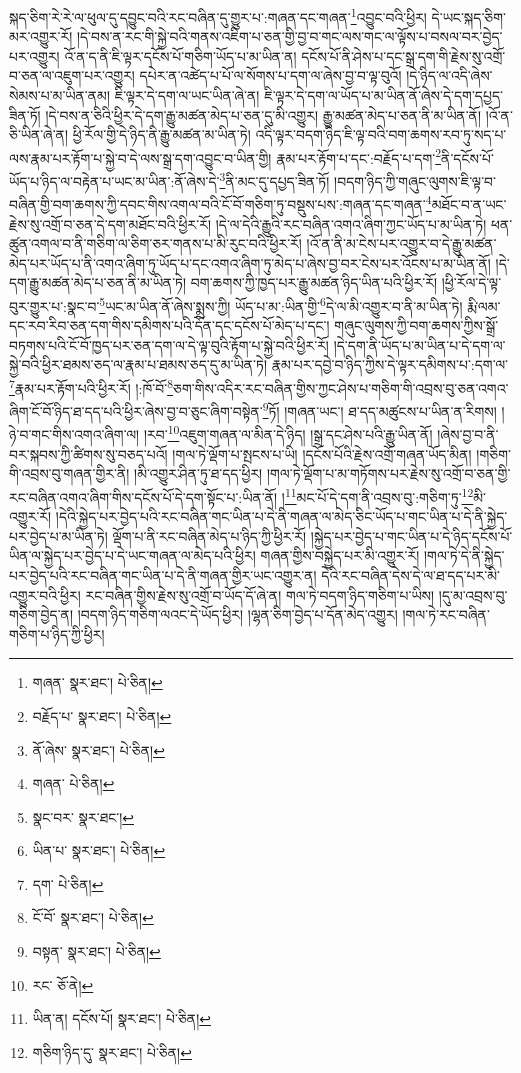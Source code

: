 སྐད་ཅིག་རེ་རེ་ལ་ཕུལ་དུ་དབྱུང་བའི་རང་བཞིན་དུ་གྱུར་པ་:གཞན་དང་གཞན་\footnote{གཞན་  སྣར་ཐང་།  པེ་ཅིན། }འབྱུང་བའི་ཕྱིར། དེ་ཡང་སྐད་ཅིག་མར་འགྱུར་རོ། །དེ་བས་ན་རང་གི་སྐྱེ་བའི་གནས་འཇིག་པ་ཅན་གྱི་བྱ་བ་གང་ལས་གང་ལ་ལྟོས་པ་བསལ་བར་བྱེད་པར་འགྱུར། འོ་ན་ད་ནི་ཇི་ལྟར་དངོས་པོ་གཅིག་ཡོད་པ་མ་ཡིན་ན། དངོས་པོ་ནི་ཤེས་པ་དང་སྒྲ་དག་གི་རྗེས་སུ་འགྲོ་བ་ཅན་ལ་འཇུག་པར་འགྱུར། དཔེར་ན་འཚེད་པ་པོ་ལ་སོགས་པ་དག་ལ་ཞེས་བྱ་བ་ལྟ་བུའོ། །དེ་ཉིད་ལ་འདི་ཞེས་སེམས་པ་མ་ཡིན་ནམ། ཇི་ལྟར་དེ་དག་ལ་ཡང་ཡིན་ཞེ་ན། ཇི་ལྟར་དེ་དག་ལ་ཡོད་པ་མ་ཡིན་ནོ་ཞེས་དེ་དག་དཔྱད་ཟིན་ཏོ། །དེ་བས་ན་ཅིའི་ཕྱིར་དེ་དག་རྒྱུ་མཚན་མེད་པ་ཅན་དུ་མི་འགྱུར། རྒྱུ་མཚན་མེད་པ་ཅན་ནི་མ་ཡིན་ནོ། །འོ་ན་ཅི་ཡིན་ཞེ་ན། ཕྱི་རོལ་གྱི་དེ་ཉིད་ནི་རྒྱུ་མཚན་མ་ཡིན་ཏེ། འདི་ལྟར་བདག་ཉིད་ཇི་ལྟ་བའི་བག་ཆགས་རབ་ཏུ་སད་པ་ལས་རྣམ་པར་རྟོག་པ་སྐྱེ་བ་དེ་ལས་སྒྲ་དག་འབྱུང་བ་ཡིན་གྱི། རྣམ་པར་རྟོག་པ་དང་:བརྗོད་པ་དག་\footnote{བརྗོད་པ་  སྣར་ཐང་།  པེ་ཅིན། }ནི་དངོས་པོ་ཡོད་པ་ཉིད་ལ་བརྟེན་པ་ཡང་མ་ཡིན་:ནོ་ཞེས་དེ་\footnote{ནོ་ཞེས་  སྣར་ཐང་།  པེ་ཅིན། }ནི་མང་དུ་དཔྱད་ཟིན་ཏོ། །བདག་ཉིད་ཀྱི་གཞུང་ལུགས་ཇི་ལྟ་བ་བཞིན་གྱི་བག་ཆགས་ཀྱི་དབང་གིས་འགལ་བའི་ངོ་བོ་གཅིག་ཏུ་བསྡུས་པས་:གཞན་དང་གཞན་\footnote{གཞན་  པེ་ཅིན། }མཐོང་བ་ན་ཡང་རྗེས་སུ་འགྲོ་བ་ཅན་དེ་དག་མཐོང་བའི་ཕྱིར་རོ། །དེ་ལ་དེའི་རྒྱུའི་རང་བཞིན་འགའ་ཞིག་ཀྱང་ཡོད་པ་མ་ཡིན་ཏེ། ཕན་ཚུན་འགལ་བ་ནི་གཅིག་ལ་ཅིག་ཅར་གནས་པ་མི་རུང་བའི་ཕྱིར་རོ། །འོ་ན་ནི་མ་ངེས་པར་འགྱུར་བ་དེ་རྒྱུ་མཚན་མེད་པར་ཡོད་པ་ནི་འགའ་ཞིག་ཏུ་ཡོད་པ་དང་འགའ་ཞིག་ཏུ་མེད་པ་ཞེས་བྱ་བར་ངེས་པར་འོངས་པ་མ་ཡིན་ནོ། །དེ་དག་རྒྱུ་མཚན་མེད་པ་ཅན་ནི་མ་ཡིན་ཏེ། བག་ཆགས་ཀྱི་ཁྱད་པར་རྒྱུ་མཚན་ཉིད་ཡིན་པའི་ཕྱིར་རོ། །ཕྱི་རོལ་དེ་ལྟ་བུར་གྱུར་པ་:སྣང་བ་\footnote{སྣང་བར་  སྣར་ཐང་། }ཡང་མ་ཡིན་ནོ་ཞེས་སྨྲས་ཀྱི། ཡོད་པ་མ་:ཡིན་གྱི་\footnote{ཡིན་པ་  སྣར་ཐང་།  པེ་ཅིན། }དེ་ལ་མི་འགྱུར་བ་ནི་མ་ཡིན་ཏེ། རྨི་ལམ་དང་རབ་རིབ་ཅན་དག་གིས་དམིགས་པའི་དོན་དང་དངོས་པོ་མེད་པ་དང་། གཞུང་ལུགས་ཀྱི་བག་ཆགས་ཀྱིས་སྒྲོ་བཏགས་པའི་ངོ་བོ་ཁྱད་པར་ཅན་དག་ལ་དེ་ལྟ་བུའི་རྟོག་པ་སྐྱེ་བའི་ཕྱིར་རོ། །དེ་དག་ནི་ཡོད་པ་མ་ཡིན་པ་དེ་དག་ལ་སྐྱེ་བའི་ཕྱིར་ཐམས་ཅད་ལ་རྣམ་པ་ཐམས་ཅད་དུ་མ་ཡིན་ཏེ། རྣམ་པར་དབྱེ་བ་ཉིད་ཀྱིས་དེ་ལྟར་དམིགས་པ་:དག་ལ་\footnote{དག་  པེ་ཅིན། }རྣམ་པར་རྟོག་པའི་ཕྱིར་རོ། །:ཁོ་བོ་\footnote{ངོ་བོ་  སྣར་ཐང་།  པེ་ཅིན། }ཅག་གིས་འདིར་རང་བཞིན་གྱིས་ཀྱང་ཤེས་པ་གཅིག་གི་འབྲས་བུ་ཅན་འགའ་ཞིག་ངོ་བོ་ཉིད་ཐ་དད་པའི་ཕྱིར་ཞེས་བྱ་བ་ཅུང་ཞིག་བསྟེན་\footnote{བསྟན་  སྣར་ཐང་།  པེ་ཅིན། }ཏོ། །གཞན་ཡང་། ཐ་དད་མཚུངས་པ་ཡིན་ན་རིགས། །ཉེ་བ་གང་གིས་འགའ་ཞིག་ལ། །རབ་\footnote{རང་  ཅོ་ནེ། }འཇུག་གཞན་ལ་མིན་དེ་ཉིད། །སྒྲ་དང་ཤེས་པའི་རྒྱུ་ཡིན་ནོ། །ཞེས་བྱ་བ་ནི་བར་སྐབས་ཀྱི་ཚིགས་སུ་བཅད་པའོ། །གལ་ཏེ་ལྡོག་པ་སྤངས་པ་ཡི། །དངོས་པོའི་རྗེས་འགྲོ་གཞན་ཡོད་མིན། །གཅིག་གི་འབྲས་བུ་གཞན་གྱིར་ནི། །མི་འགྱུར་ཤིན་ཏུ་ཐ་དད་ཕྱིར། །གལ་ཏེ་ལྡོག་པ་མ་གཏོགས་པར་རྗེས་སུ་འགྲོ་བ་ཅན་གྱི་རང་བཞིན་འགའ་ཞིག་གིས་དངོས་པོ་དེ་དག་སྟོང་པ་:ཡིན་ནོ། །\footnote{ཡིན་ན། དངོས་པོ།  སྣར་ཐང་།  པེ་ཅིན། }མང་པོ་དེ་དག་ནི་འབྲས་བུ་:གཅིག་ཏུ་\footnote{གཅིག་ཉིད་དུ་  སྣར་ཐང་།  པེ་ཅིན། }མི་འགྱུར་རོ། །དེའི་སྐྱེད་པར་བྱེད་པའི་རང་བཞིན་གང་ཡིན་པ་དེ་ནི་གཞན་ལ་མེད་ཅིང་ཡོད་པ་གང་ཡིན་པ་དེ་ནི་སྐྱེད་པར་བྱེད་པ་མ་ཡིན་ཏེ། ལྡོག་པ་ནི་རང་བཞིན་མེད་པ་ཉིད་ཀྱི་ཕྱིར་རོ། །སྐྱེད་པར་བྱེད་པ་གང་ཡིན་པ་དེ་ཉིད་དངོས་པོ་ཡིན་ལ་སྐྱེད་པར་བྱེད་པ་དེ་ཡང་གཞན་ལ་མེད་པའི་ཕྱིར། གཞན་གྱིས་བསྐྱེད་པར་མི་འགྱུར་རོ། །གལ་ཏེ་དེ་ནི་སྐྱེད་པར་བྱེད་པའི་རང་བཞིན་གང་ཡིན་པ་དེ་ནི་གཞན་གྱིར་ཡང་འགྱུར་ན། དེའི་རང་བཞིན་དེས་དེ་ལ་ཐ་དད་པར་མི་འགྱུར་བའི་ཕྱིར། རང་བཞིན་གྱིས་རྗེས་སུ་འགྲོ་བ་ཡོད་དོ་ཞེ་ན། གལ་ཏེ་བདག་ཉིད་གཅིག་པ་ཡིས། །དུ་མ་འབྲས་བུ་གཅིག་བྱེད་ན། །བདག་ཉིད་གཅིག་ལའང་དེ་ཡོད་ཕྱིར། །ལྷན་ཅིག་བྱེད་པ་དོན་མེད་འགྱུར། །གལ་ཏེ་རང་བཞིན་གཅིག་པ་ཉིད་ཀྱི་ཕྱིར། 